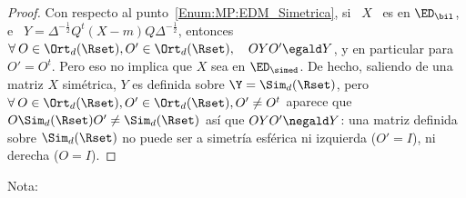 \begin{proof}
  Con  respecto   al  punto~\ref{Enum:MP:EDM_Simetrica},  si  \  $X$   \  es  en
  $\ED_\bil$,  e  \  $Y  =  \Delta^{-\frac12} Q^t  (X-m)  Q  \Delta^{-\frac12}$,
  entonces \ $\forall \: O \in \Ort_d(\Rset), O' \in \Ort_d(\Rset), \quad O Y O'
  \egald Y$, y en particular para $O' = O^t$. Pero eso no implica que $X$ sea en
  $\ED_\simed$.  De  hecho, saliendo  de  una  matriz  $X$ sim\'etrica,  $Y$  es
  definida sobre $\Y = \Sim_d(\Rset)$,  pero $\forall \: O \in \Ort_d(\Rset), O'
  \in  \Ort_d(\Rset),  O'   \ne  O^t$  aparece  que  $O   \Sim_d(\Rset)  O'  \ne
  \Sim_d(\Rset)$  as\'i  que $O  Y  O' \negald  Y$:  una  matriz definida  sobre
  $\Sim_d(\Rset)$ no puede ser a  simetr\'ia esf\'erica ni izquierda ($O' = I$),
  ni derecha ($O = I$).
\end{proof}
%
Nota:
%
